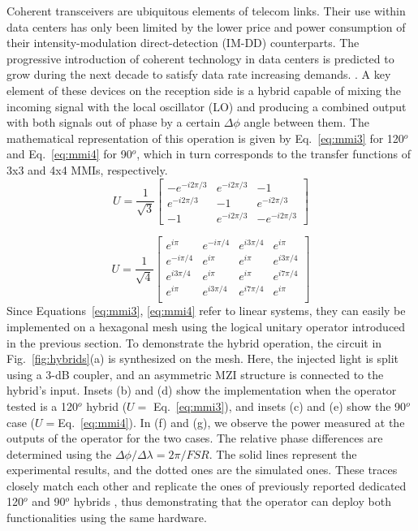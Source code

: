 Coherent transceivers are ubiquitous elements of telecom links.
Their use within data centers has only been limited by the lower price and power consumption of their intensity-modulation direct-detection (IM-DD) counterparts.
The progressive introduction of coherent technology in data centers is predicted to grow during the next decade to satisfy data rate increasing demands.
\cite{maharry_first_2022}.
A key element of these devices on the reception side is a hybrid capable of mixing the incoming signal with the local oscillator (LO) and producing a combined output with both signals out of phase by a certain $\Delta\phi$ angle between them.
The mathematical representation of this operation is given by Eq.~\eqref{eq:mmi3} for 120$^o$ and Eq.~\eqref{eq:mmi4} for 90$^o$, which in turn corresponds to the transfer functions of 3x3 and 4x4 MMIs, respectively.
\begin{equation}\label{eq:mmi3}
	U = \frac{1}{\sqrt{3}}
	\begin{bmatrix}
		-e^{-i2\pi/3} & e^{-i2\pi/3} & -1             \\
		e^{-i2\pi/3}  & -1           & e^{-i2\pi/3}   \\
		-1            & e^{-i2\pi/3} & - e^{-i2\pi/3}
	\end{bmatrix}
\end{equation}

\begin{equation}\label{eq:mmi4}
	U = \frac{1}{\sqrt{4}}
	\begin{bmatrix}
		e^{i\pi}    & e^{-i\pi/4} & e^{i3\pi/4} & e^{i\pi}    \\
		e^{-i\pi/4} & e^{i\pi}    & e^{i\pi}    & e^{i3\pi/4} \\
		e^{i3\pi/4} & e^{i\pi}    & e^{i\pi}    & e^{i7\pi/4} \\
		e^{i\pi}    & e^{i3\pi/4} & e^{i7\pi/4} & e^{i\pi}    \\
	\end{bmatrix}
\end{equation}
Since Equations~\eqref{eq:mmi3}, \eqref{eq:mmi4} refer to linear systems, they can easily be implemented on a hexagonal mesh using the logical unitary operator introduced in the previous section.
To demonstrate the hybrid operation, the circuit in Fig.~\ref{fig:hybrids}(a) is synthesized on the mesh.
Here, the injected light is split using a 3-dB coupler, and an asymmetric MZI structure is connected to the hybrid's input.
Insets (b) and (d) show the implementation when the operator tested is a 120$^o$ hybrid ($U = $ Eq.~\eqref{eq:mmi3}), and insets (c) and (e) show the 90$^o$ case ($U = $Eq.~\eqref{eq:mmi4}).
In (f) and (g), we observe the power measured at the outputs of the operator for the two cases.
The relative phase differences are determined using the $\Delta\phi/\Delta\lambda = 2\pi/FSR$.
The solid lines represent the experimental results, and the dotted ones are the simulated ones.
These traces closely match each other and replicate the ones of previously reported dedicated 120$^o$ and 90$^o$ hybrids \cite{saber_demonstration_2018, yu_high-performance_2020, reyes-iglesias_high-performance_2012}, thus demonstrating that the operator can deploy both functionalities using the same hardware.

